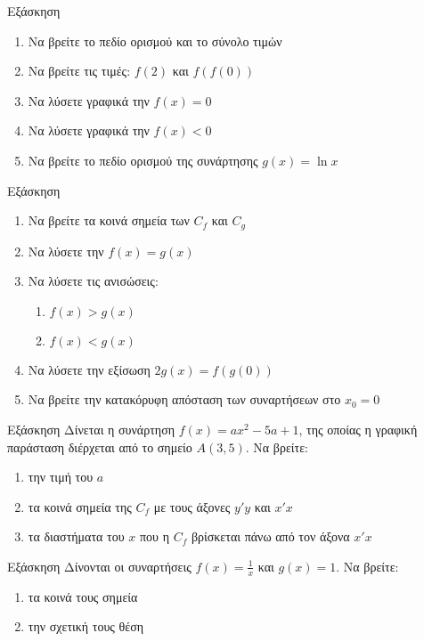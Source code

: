 \documentclass[greek]{beamer}
\begin{document}
\begin{frame}{Εξάσκηση}
 \href{https://www.geogebra.org/m/jmmx7bp8}{}
 \begin{enumerate}
  \item<1-> Να βρείτε το πεδίο ορισμού και το σύνολο τιμών
  \item Να βρείτε τις τιμές: $f(2)$ και $f(f(0))$
  \item<2-> Να λύσετε γραφικά την $f(x)=0$
  \item<3-> Να λύσετε γραφικά την $f(x)<0$
  \item<4-> Να βρείτε το πεδίο ορισμού της συνάρτησης $g(x)=\ln x$
 \end{enumerate}
\end{frame}

\begin{frame}{Εξάσκηση}
 \href{https://www.geogebra.org/m/td6m58hw}{}
 \begin{enumerate}
  \item<1-> Να βρείτε τα κοινά σημεία των $C_f$ και $C_g$
  \item<2-> Να λύσετε την $f(x)=g(x)$
  \item<3-> Να λύσετε τις ανισώσεις:
        \begin{enumerate}
         \item<4-> $f(x)>g(x)$
         \item<5-> $f(x)<g(x)$
        \end{enumerate}
  \item<6-> Να λύσετε την εξίσωση $2g(x)=f(g(0))$
  \item<7-> Να βρείτε την κατακόρυφη απόσταση των συναρτήσεων στο $x_0=0$
 \end{enumerate}
\end{frame}

\begin{frame}{Εξάσκηση}
 Δίνεται η συνάρτηση $f(x)=ax^2-5a+1$, της οποίας η γραφική παράσταση διέρχεται από το σημείο $Α(3,5)$. Να βρείτε:
 \begin{enumerate}
  \item<1-> την τιμή του $a$
  \item<2-> τα κοινά σημεία της $C_f$ με τους άξονες $y'y$ και $x'x$
  \item<3-> τα διαστήματα του $x$ που η $C_f$ βρίσκεται πάνω από τον άξονα $x'x$
 \end{enumerate}
\end{frame}

\begin{frame}{Εξάσκηση}
 Δίνονται οι συναρτήσεις $f(x)=\frac{1}{x}$ και $g(x)=1$. Να βρείτε:
 \begin{enumerate}
  \item<1-> τα κοινά τους σημεία
  \item<2-> την σχετική τους θέση
 \end{enumerate}
\end{frame}
\end{document}
